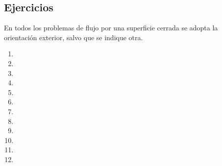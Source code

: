 \subsection{Ejercicios}
En todos los problemas de flujo por una superficie cerrada se adopta la orientación exterior, salvo que se indique otra.
\begin{enumerate}
    \setlength{\itemsep}{1pt}
    \item 
    \item 
    \item 
    \item 
    \item 
    \item 
    \item 
    \item 
    \item 
    \item 
    \item 
    \item 
\end{enumerate}
